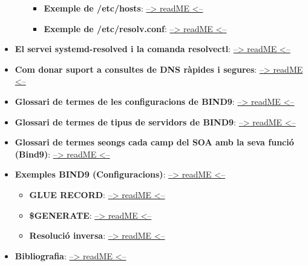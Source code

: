\documentclass[]{article}
\begin{document}
\begin{itemize}
\begin{itemize}
    \begin{itemize}
    \item
      \textbf{Exemple de /etc/hosts}:
      \protect\hyperlink{exemple-de-etchosts}{--\textgreater{} readME
      \textless{}--}
    \item
      \textbf{Exemple de /etc/resolv.conf}:
      \protect\hyperlink{exemple-de-etcresolvconf}{--\textgreater{}
      readME \textless{}--}
    \end{itemize}
  \end{itemize}
\item
  \textbf{El servei systemd-resolved i la comanda resolvectl}:
  \protect\hyperlink{el-servei-systemd-resolved-i-la-comanda-resolvectl}{--\textgreater{}
  readME \textless{}--}
\item
  \textbf{Com donar suport a consultes de DNS ràpides i segures}:
  \protect\hyperlink{com-donar-suport-a-consultes-de-dns-ruxe0pides-i-segures}{--\textgreater{}
  readME \textless{}--}
\item
  \textbf{Glossari de termes de les configuracions de BIND9}:
  \protect\hyperlink{glossari-de-termes-de-les-configuracions-de-bind9}{--\textgreater{}
  readME \textless{}--}
\item
  \textbf{Glossari de termes de tipus de servidors de BIND9}:
  \protect\hyperlink{glossari-de-termes-de-tipus-de-servidors-de-bind9}{--\textgreater{}
  readME \textless{}--}
\item
  \textbf{Glossari de termes seongs cada camp del SOA amb la seva funció
  (Bind9)}:
  \protect\hyperlink{glossari-de-termes-seongs-cada-camp-del-soa-amb-la-seva-funciuxf3-bind9}{--\textgreater{}
  readME \textless{}--}
\item
  \textbf{Exemples BIND9 (Configuracions)}:
  \protect\hyperlink{exemples-bind9-configuracions}{--\textgreater{}
  readME \textless{}--}

  \begin{itemize}
  \item
    \textbf{GLUE RECORD}:
    \protect\hyperlink{glue-record}{--\textgreater{} readME
    \textless{}--}
  \item
    \textbf{\$GENERATE}: \protect\hyperlink{generate}{--\textgreater{}
    readME \textless{}--}
  \item
    \textbf{Resolució inversa}:
    \protect\hyperlink{resoluciuxf3-inversa}{--\textgreater{} readME
    \textless{}--}
  \end{itemize}
\item
  \textbf{Bibliografia}:
  \protect\hyperlink{bibliografia}{--\textgreater{} readME
  \textless{}--}
\end{itemize}
\end{document}
